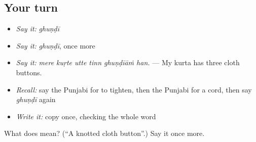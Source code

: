 \subsection*{Your turn}
\begin{itemize}
\raggedright
  \item \emph{Say it:} \emph{ghuṇḍī}
  \item \emph{Say it:} \emph{ghuṇḍī}, once more
  \item \emph{Say it:} \emph{mere kuṛte utte tinn ghuṇḍīāṁ han.} — My kurta has three cloth buttons.
  \item \emph{Recall:} say the Punjabi for to tighten, then the Punjabi for a cord, then say \emph{ghuṇḍī} again
  \item \emph{Write it:} copy \textbf{} once, checking the whole word
\end{itemize}

\begin{tcolorbox}[breakable,colback=teal!4,colframe=teal!35!black,title={Before you move on}]
What does  mean? (\textquotedblleft{}A knotted cloth button\textquotedblright{}.) Say it once more.
\end{tcolorbox}
